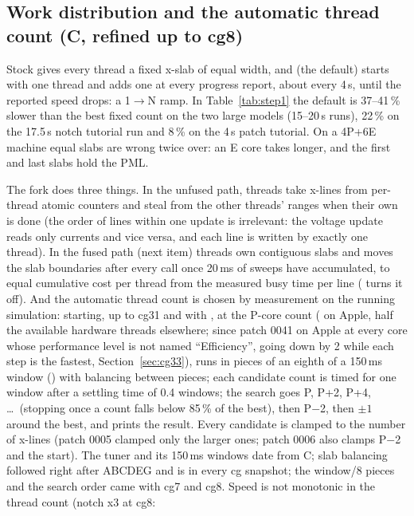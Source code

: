 \subsection{Work distribution and the automatic thread count (C, refined up to cg8)}
Stock gives every thread a fixed x-slab of equal width, and  (the default) starts with one thread
and adds one at every progress report, about every 4\,s, until the reported speed drops: a 1$\to$N ramp. In
Table~\ref{tab:step1} the default is 37--41\,\% slower than the best fixed count on the two large models (15--20\,s
runs), 22\,\% on the 17.5\,s notch tutorial run and 8\,\% on the 4\,s patch tutorial. On a 4P+6E machine equal slabs
are wrong twice over: an E core takes longer, and the first and last slabs hold the PML.

The fork does three things. In the unfused path, threads take x-lines from per-thread atomic counters and steal
from the other threads' ranges when their own is done (the order of lines within one update is irrelevant: the
voltage update reads only currents and vice versa, and each line is written by exactly one thread). In the fused
path (next item) threads own contiguous slabs and  moves the slab boundaries after every
 call once 20\,ms of sweeps have accumulated, to equal cumulative cost per thread from the measured
busy time per line ( turns it off). And the automatic thread count is chosen by measurement
on the running simulation: starting, up to cg31 and with , at the P-core count
( on Apple, half the available hardware threads elsewhere; since patch 0041 on Apple at every
core whose performance level is not named ``Efficiency'', going down by 2 while each step is the fastest, Section~\ref{sec:cg33}),  runs in pieces of an eighth of a 150\,ms window
() with balancing between pieces; each candidate count is timed for one window after a
settling time of 0.4 windows; the search goes P, P+2, P+4, \ldots\ (stopping once a count falls below 85\,\% of the
best), then P$-$2, then $\pm1$ around the best, and prints the result. Every candidate is clamped to the number of
x-lines (patch 0005 clamped only the larger ones; patch 0006 also clamps P$-$2 and the start). The tuner and its
150\,ms windows date from C; slab balancing followed right after ABCDEG and is in every cg snapshot; the window/8
pieces and the search order came with cg7 and cg8. Speed is not monotonic in the thread count (notch x3 at cg8:
